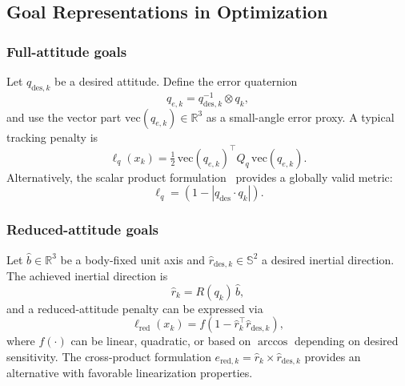 \documentclass[conference]{IEEEtran}
\begin{document}
\subsection{Goal Representations in Optimization}\label{subsec:goal_representations}

\subsubsection{Full-attitude goals}\label{subsubsec:full_attitude}
Let $q_{\mathrm{des},k}$ be a desired attitude. Define the error quaternion
\begin{equation}\label{eq:error_quat}
    q_{e,k} = q_{\mathrm{des},k}^{-1} \otimes q_k,
\end{equation}
and use the vector part $\mathrm{vec}(q_{e,k}) \in \mathbb{R}^3$ as a small-angle error proxy. A typical tracking penalty is
\begin{equation}\label{eq:quat_tracking_penalty}
    \ell_q(x_k) = \tfrac{1}{2}\,\mathrm{vec}(q_{e,k})^\top Q_q\,\mathrm{vec}(q_{e,k}).
\end{equation}
Alternatively, the scalar product formulation~\cite{gatherer_magnetorquer-only_2019} provides a globally valid metric:
\begin{equation}\label{eq:quat_scalar_cost}
    \ell_q = (1 - |q_{\text{des}} \cdot q_k|).
\end{equation}

\subsubsection{Reduced-attitude goals}\label{subsubsec:reduced_attitude}
Let $\hat{b} \in \mathbb{R}^3$ be a body-fixed unit axis and $\hat{r}_{\mathrm{des},k}\in\mathbb{S}^2$ a desired inertial direction. The achieved inertial direction is
\begin{equation}\label{eq:achieved_direction}
    \hat{r}_k = R(q_k)\,\hat{b},
\end{equation}
and a reduced-attitude penalty can be expressed via
\begin{equation}\label{eq:reduced_attitude_cost}
    \ell_{\mathrm{red}}(x_k) = f(1 - \hat{r}_k^\top \hat{r}_{\mathrm{des},k}),
\end{equation}
where $f(\cdot)$ can be linear, quadratic, or based on $\arccos$ depending on desired sensitivity. The cross-product formulation $e_{\mathrm{red},k} = \hat{r}_k \times \hat{r}_{\mathrm{des},k}$ provides an alternative with favorable linearization properties.
\end{document}
